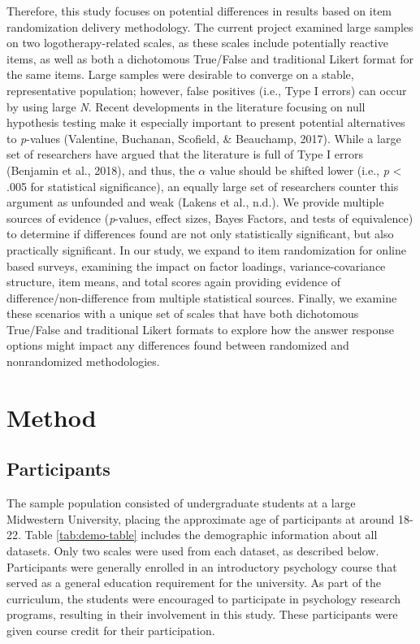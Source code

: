 \documentclass[english,man, mask]{apa6}
\theoremstyle{definition}
\theoremstyle{definition}
\theoremstyle{definition}
\theoremstyle{remark}
\begin{document}
Therefore, this study focuses on potential differences in results based
on item randomization delivery methodology. The current project examined
large samples on two logotherapy-related scales, as these scales include
potentially reactive items, as well as both a dichotomous True/False and
traditional Likert format for the same items. Large samples were
desirable to converge on a stable, representative population; however,
false positives (i.e., Type I errors) can occur by using large \emph{N}.
Recent developments in the literature focusing on null hypothesis
testing make it especially important to present potential alternatives
to \emph{p}-values (Valentine, Buchanan, Scofield, \& Beauchamp, 2017).
While a large set of researchers have argued that the literature is full
of Type I errors (Benjamin et al., 2018), and thus, the \(\alpha\) value
should be shifted lower (i.e., \emph{p} \textless{} .005 for statistical
significance), an equally large set of researchers counter this argument
as unfounded and weak (Lakens et al., n.d.). We provide multiple sources
of evidence (\emph{p}-values, effect sizes, Bayes Factors, and tests of
equivalence) to determine if differences found are not only
statistically significant, but also practically significant. In our
study, we expand to item randomization for online based surveys,
examining the impact on factor loadings, variance-covariance structure,
item means, and total scores again providing evidence of
difference/non-difference from multiple statistical sources. Finally, we
examine these scenarios with a unique set of scales that have both
dichotomous True/False and traditional Likert formats to explore how the
answer response options might impact any differences found between
randomized and nonrandomized methodologies.

\section{Method}\label{method}

\subsection{Participants}\label{participants}

The sample population consisted of undergraduate students at a large
Midwestern University, placing the approximate age of participants at
around 18-22. Table \ref{tab:demo-table} includes the demographic
information about all datasets. Only two scales were used from each
dataset, as described below. Participants were generally enrolled in an
introductory psychology course that served as a general education
requirement for the university. As part of the curriculum, the students
were encouraged to participate in psychology research programs,
resulting in their involvement in this study. These participants were
given course credit for their participation.
\end{document}
